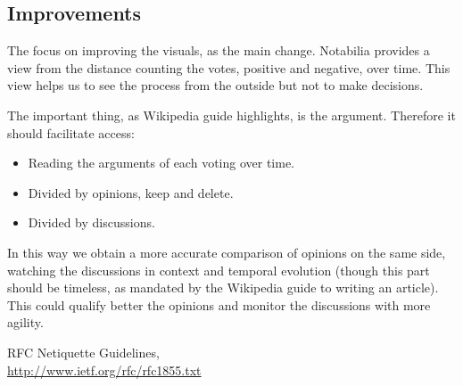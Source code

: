 \documentclass[11pt]{scrartcl}
\begin{document}

\subsection{Improvements}
\label{sub:improvements}

\par The focus on improving the visuals, as the main change. Notabilia provides a view from the distance counting the votes, positive and negative, over time. This view helps us to see the process from the outside but not to make decisions.

\par The important thing, as Wikipedia guide highlights, is the argument. Therefore it should facilitate access:

\begin{itemize}
	\item Reading the arguments of each voting over time.
	\item Divided by opinions, keep and delete.
	\item Divided by discussions.
\end{itemize}

\par In this way we obtain a more accurate comparison of opinions on the same side, watching the discussions in context and temporal evolution (though this part should be timeless, as mandated by the Wikipedia guide to writing an article). This could qualify better the opinions and monitor the discussions with more agility.

\begin{thebibliography}{9}

    RFC Netiquette Guidelines,\\
    \url{http://www.ietf.org/rfc/rfc1855.txt}

\end{thebibliography}
\end{document}
